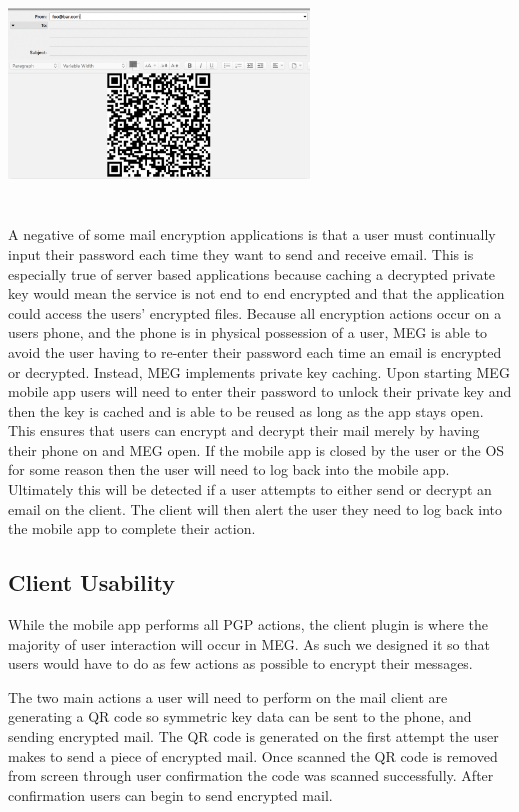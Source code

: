 \documentclass[10pt]{article}
\begin{document}
\begin{multicols}{2}
\begin{center}
\includegraphics[width=8cm,height=6cm]{qr-code-thunderbird.png}
\label{fig:qr}
\end{center}
\par A negative of some mail encryption applications is that a user must continually input their password each time they want to send and receive email. This is especially true of server based applications because caching a decrypted private key would mean the service is not end to end encrypted and that the application could access the users' encrypted files. Because all encryption actions occur on a users phone, and the phone is in physical possession of a user, MEG is able to avoid the user having to re-enter their password each time an email is encrypted or decrypted. Instead, MEG implements private key caching. Upon starting MEG mobile app users will need to enter their password to unlock their private key and then the key is cached and is able to be reused as long as the app stays open. This ensures that users can encrypt and decrypt their mail merely by having their phone on and MEG open. If the mobile app is closed by the user or the OS for some reason then the user will need to log back into the mobile app. Ultimately this will be detected if a user attempts to either send or decrypt an email on the client. The client will then alert the user they need to log back into the mobile app to complete their action.
\subsection{Client Usability}
\par While the mobile app performs all PGP actions, the client plugin is where the majority of user interaction will occur in MEG. As such we designed it so that users would have to do as few actions as possible to encrypt their messages.
\par The two main actions a user will need to perform on the mail client are generating a QR code so symmetric key data can be sent to the phone, and sending encrypted mail. The QR code is generated on the first attempt the user makes to send a piece of encrypted mail. Once scanned the QR code is removed from screen through user confirmation the code was scanned successfully. After confirmation users can begin to send encrypted mail.
\end{multicols}
\end{document}

